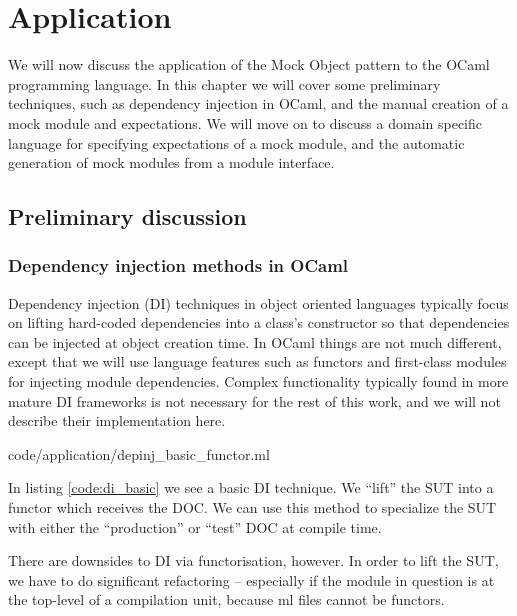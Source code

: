 \chapter{Application}
\label{application}

We will now discuss the application of the Mock Object pattern to the
OCaml programming language. In this chapter we will cover some
preliminary techniques, such as dependency injection in OCaml, and the
manual creation of a mock module and expectations. We will move on to
discuss a domain specific language for specifying expectations of a
mock module, and the automatic generation of mock modules from a
module interface.

\section{Preliminary discussion}

\subsection{Dependency injection methods in OCaml}
\label{application:di}

Dependency injection (DI) techniques in object oriented languages
typically focus on lifting hard-coded dependencies into a class's
constructor so that dependencies can be injected at object creation
time. In OCaml things are not much different, except that we will use
language features such as functors and first-class modules for
injecting module dependencies. Complex functionality typically found
in more mature DI frameworks is not necessary for the rest of this
work, and we will not describe their implementation here.


 {code/application/depinj_basic_functor.ml}

In listing \ref{code:di_basic} we see a basic DI technique. We
``lift'' the SUT into a functor which receives the DOC. We can use
this method to specialize the SUT with either the ``production'' or
``test'' DOC at compile time.

There are downsides to DI via functorisation, however. In order to
lift the SUT, we have to do significant refactoring -- especially if
the module in question is at the top-level of a compilation unit,
because ml files cannot be functors.

